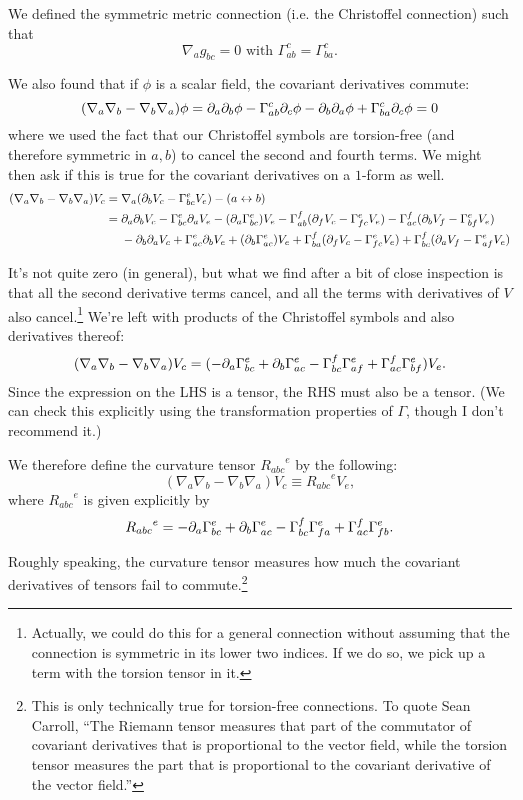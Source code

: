 We defined the symmetric metric connection (i.e. the Christoffel connection) such that
$$\nabla_a g_{bc}=0\text{ with } \Gamma^c_{ab}=\Gamma^{c}_{ba}.$$

We also found that if $\phi$ is a scalar field, the covariant derivatives commute:
$$(\nabla_a \nabla_b - \nabla_b \nabla_a)\phi = \partial_a \partial_b \phi - \Gamma^c_{ab} \partial_c \phi - \partial_b \partial_a \phi+ \Gamma^c_{ba}\partial_c\phi =0$$
where we used the fact that our Christoffel symbols are torsion-free (and therefore symmetric in $a,b$) to cancel the second and fourth terms.
We might then ask if this is true for the covariant derivatives on a $1$-form as well.
\begin{align*}
    (\nabla_a \nabla_b - \nabla_b \nabla_a)V_c ={}&
    \nabla_a(\partial_b V_c - \Gamma^e_{bc} V_e) - (a\leftrightarrow b)\\
    ={}&\partial_a\partial_b V_c - \Gamma^e_{bc} \partial_a V_e - (\partial_a \Gamma^e_{bc})V_e - \Gamma^f_{ab} (\partial_f V_c- \Gamma^e_{fc} V_e) -\Gamma^f_{ac}(\partial_b V_f - \Gamma^e_{bf}V_e) \\
    &-\partial_b\partial_a V_c + \Gamma^e_{ac}\partial_b V_e + (\partial_b \Gamma^e_{ac})V_e +\Gamma^f_{ba}(\partial_f V_c - \Gamma^e_{fc} V_e) +\Gamma^f_{bc}(\partial_a V_f -\Gamma^e_{af} V_e)
\end{align*}

It's not quite zero (in general), but what we find after a bit of close inspection is that all the second derivative terms cancel, and all the terms with derivatives of $V$ also cancel.\footnote{Actually, we could do this for a general connection without assuming that the connection is symmetric in its lower two indices. If we do so, we pick up a term with the torsion tensor in it.} We're left with products of the Christoffel symbols and also derivatives thereof:
$$(\nabla_a\nabla_b - \nabla_b \nabla_a)V_c=(-\partial_a \Gamma^e_{bc}+\partial_b \Gamma^e_{ac} - \Gamma^f_{bc} \Gamma^e_{af}+\Gamma^f_{ac} \Gamma^e_{bf}) V_e.$$
Since the expression on the LHS is a tensor, the RHS must also be a tensor. (We can check this explicitly using the transformation properties of $\Gamma$, though I don't recommend it.)

\begin{defn}
We therefore define the curvature tensor ${R_{abc}}^e$ by the following:
\begin{equation}\label{ricciid}
    (\nabla_a \nabla_b - \nabla_b \nabla_a)V_c\equiv {R_{abc}}^e V_e,
\end{equation}
where ${R_{abc}}^e$ is given explicitly by
$${R_{abc}}^e = -\partial_a \Gamma^e_{bc} +\partial_b \Gamma^e_{ac}-\Gamma^f_{bc} \Gamma^e_{fa}+\Gamma^f_{ac} \Gamma^e_{fb}.$$

Roughly speaking, the curvature tensor measures how much the covariant derivatives of tensors fail to commute.\footnote{This is only technically true for torsion-free connections. To quote Sean Carroll, ``The Riemann tensor measures that part of the commutator of covariant derivatives that is proportional to the vector field, while the torsion tensor measures the part that is proportional to the covariant derivative of the vector field.''}
\end{defn}

